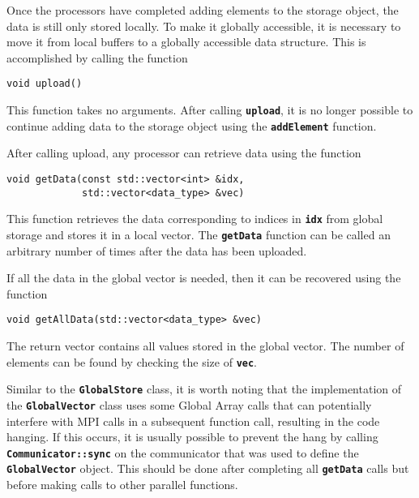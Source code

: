 Once the processors have completed adding elements to the storage object, the data is still only stored locally. To make it globally accessible, it is necessary to move it from local buffers to a globally accessible data structure. This is accomplished by calling the function

{
\color{red}
\begin{Verbatim}[fontseries=b]
void upload()
\end{Verbatim}
}

This function takes no arguments. After calling \texttt{\textbf{upload}}, it is
no longer possible to continue adding data to the storage object using the
\texttt{\textbf{addElement}} function.

After calling upload, any processor can retrieve data using the function

{
\color{red}
\begin{Verbatim}[fontseries=b]
void getData(const std::vector<int> &idx,
             std::vector<data_type> &vec)
\end{Verbatim}
}

This function retrieves the data corresponding to indices in
\texttt{\textbf{idx}} from global storage and stores it in a local vector. The
\texttt{\textbf{getData}} function can be called an arbitrary number of times after the data has been uploaded.

If all the data in the global vector is needed, then it can be recovered using
the function

{
\color{red}
\begin{Verbatim}[fontseries=b]
void getAllData(std::vector<data_type> &vec)
\end{Verbatim}
}

The return vector contains all values stored in the global vector. The number of
elements can be found by checking the size of \texttt{\textbf{vec}}.

Similar to the \texttt{\textbf{GlobalStore}} class, it is worth noting that
the implementation of the \texttt{\textbf{GlobalVector}} class uses some Global
Array calls that can potentially interfere with MPI calls in a subsequent
function call, resulting in the code hanging. If this occurs, it is usually
possible to prevent the hang by calling \texttt{\textbf{Communicator::sync}} on
the communicator that was used to define the \texttt{\textbf{GlobalVector}}
object. This should be done after completing all \texttt{\textbf{getData}} calls
but before making calls to other parallel functions.
